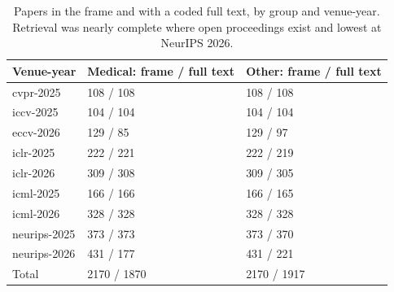 \documentclass[11pt]{article}
\begin{document}
\begin{table}[htbp]
\centering\footnotesize
\renewcommand{\thetable}{A1}
\caption{Papers in the frame and with a coded full text, by group and venue-year. Retrieval was nearly complete where open proceedings exist and lowest at NeurIPS 2026.}\label{tab:tablea1}
\begin{tabularx}{\textwidth}{XL{4.2cm}L{4.2cm}}
\toprule
\textbf{Venue-year} & \textbf{Medical: frame / full text} & \textbf{Other: frame / full text} \\ \midrule
cvpr-2025 & 108 / 108 & 108 / 108 \\
iccv-2025 & 104 / 104 & 104 / 104 \\
eccv-2026 & 129 / 85 & 129 / 97 \\
iclr-2025 & 222 / 221 & 222 / 219 \\
iclr-2026 & 309 / 308 & 309 / 305 \\
icml-2025 & 166 / 166 & 166 / 165 \\
icml-2026 & 328 / 328 & 328 / 328 \\
neurips-2025 & 373 / 373 & 373 / 370 \\
neurips-2026 & 431 / 177 & 431 / 221 \\
Total & 2170 / 1870 & 2170 / 1917 \\
\bottomrule
\end{tabularx}
\end{table}
\end{document}
